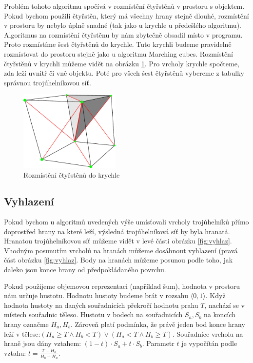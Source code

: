 Problém tohoto algoritmu spočívá v rozmístění čtyřstěnů v prostoru s objektem.
Pokud bychom použili čtyřstěn, který má všechny hrany stejně dlouhé, rozmístění v prostoru by nebylo úplně snadné (tak jako u krychle u předešlého algoritmu).
Algoritmus na rozmístění čtyřstěnu by nám zbytečně obsadil místo v programu.
Proto rozmístíme šest čtyřstěnů do krychle.
Tuto krychli budeme pravidelně rozmísťovat do prostoru stejně jako u algoritmu Marching cubes.
Rozmístění čtyřstěnů v krychli můžeme vidět na obrázku \ref{fig:tetraincube}.
Pro vrcholy krychle spočteme, zda leží uvnitř či vně objektu.
Poté pro všech šest čtyřstěnů vybereme z tabulky správnou trojúhelníkovou síť.

\begin{figure}[h]
\centering
\includegraphics[width=5cm,keepaspectratio]{obr/tetra.pdf}
\caption{Rozmístění čtyřstěnů do krychle}
\label{fig:tetraincube}
\end{figure}

\subsection{Vyhlazení}

Pokud bychom u algoritmů uvedených výše umísťovali vrcholy trojúhelníků přímo doprostřed hrany na které leží, výsledná trojúhelníková síť by byla hranatá.
Hranatou troj\-ú\-hel\-ní\-ko\-vou síť můžeme vidět v levé části obrázku \ref{fig:vyhlaz}.
Vhodným posunutím vrcholů na hranách můžeme dosáhnout vyhlazení (pravá část obrázku \ref{fig:vyhlaz}.
Body na hranách můžeme posunou podle toho, jak daleko jsou konce hrany od předpokládaného povrchu.

Pokud použijeme objemovou reprezentaci (například šum), hodnota v prostoru nám určuje hustotu.
Hodnotu hustoty budeme brát v rozsahu $\langle 0,1 \rangle$.
Když hodnota hustoty na daných souřadnicích překročí hodnotu prahu $T$, nachází se v místech souřadnic těleso.
Hustotu v bodech na souřadnicích $S_a,S_b$ na koncích hrany označme $H_a,H_b$.
Zároveň platí podmínka, že právě jeden bod konce hrany leží v tělese:$(H_a \geq T \wedge H_b < T) \vee (H_a < T \wedge H_b \geq T)$.
Souřadnice vrcholu na hraně jsou dány vztahem: $(1-t)\cdot S_a + t \cdot S_b$.
Parametr $t$ je vypočítán podle vztahu: $t=\frac{T-H_a}{H_b-H_a}$.

